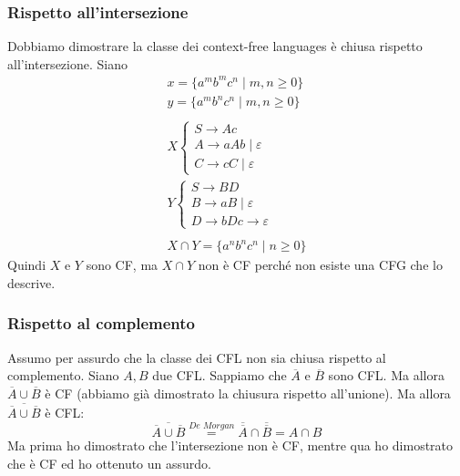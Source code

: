 \documentclass[italian]{article}
\newcommand{\taleche}{\;|\;}
\begin{document}
	\subsubsection{Rispetto all'intersezione}
	Dobbiamo dimostrare la classe dei context-free languages è chiusa rispetto all'intersezione. Siano
	\begin{gather*}
		x = \{ a^mb^mc^n \taleche m,n \geq 0 \} \\
		y = \{ a^mb^nc^n \taleche m,n \geq 0 \} \\\\
		X \begin{cases*}
			S \to Ac \\
			A \to aAb \taleche \varepsilon \\
			C \to cC \taleche \varepsilon	
		\end{cases*} \\
		Y \begin{cases*}
			S \to BD \\
			B \to aB \taleche \varepsilon \\
			D \to bDc \to \varepsilon
		\end{cases*} \\\\
		X \cap Y = \{ a^nb^nc^n \taleche n \geq 0 \}
	\end{gather*}
	Quindi $X$ e $Y$ sono CF, ma $X \cap Y$ non è CF perché non esiste una CFG che lo descrive.
	
	\subsubsection{Rispetto al complemento}
	Assumo per assurdo che la classe dei CFL non sia chiusa rispetto al complemento. Siano $A,B$ due CFL. Sappiamo che $\overline{A}$ e $\overline{B}$ sono CFL. Ma allora $\overline{A} \cup \overline{B}$ è CF (abbiamo già dimostrato la chiusura rispetto all'unione). Ma allora $\overline{\overline{A} \cup \overline{B}}$ è CFL:
	\[
		\overline{\overline{A} \cup \overline{B}} \stackrel{\textit{De Morgan}}{=} \overline{\overline{A}} \cap \overline{\overline{B}} = A \cap B
	\]
	Ma prima ho dimostrato che l'intersezione non è CF, mentre qua ho dimostrato che è CF ed ho ottenuto un assurdo.
	
	
\end{document}

